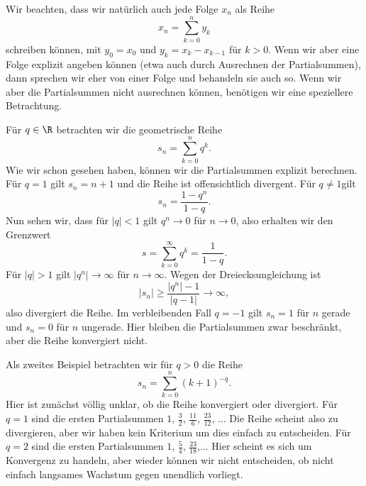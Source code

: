 \documentclass[letterpaper,10pt,english]{jupyterBook}
\begin{document}
Wir beachten, dass wir natürlich auch jede Folge \(x_n\) als Reihe
\begin{equation*}
 x_n =\sum_{k=0}^n y_k
\end{equation*}
schreiben können, mit \(y_0=x_0\) und \(y_k = x_k - x_{k-1}\) für \(k > 0\). Wenn wir aber eine Folge explizit angeben können (etwa auch durch Ausrechnen der Partialsummen), dann sprechen wir eher von einer Folge und behandeln sie auch so. Wenn wir aber die Partialsummen nicht ausrechnen können, benötigen wir eine speziellere Betrachtung.
\label{metrik/reihen:example-1}
\begin{example}{}{}



Für \(q \in \R\) betrachten wir die geometrische Reihe
\begin{equation*}
 s_n = \sum_{k=0}^n q^k.
\end{equation*}
Wie wir schon gesehen haben, können wir die Partialsummen explizit berechnen. Für \(q=1\) gilt \(s_n = n+1\) und die Reihe ist offensichtlich divergent. Für \(q\neq 1 \)gilt
\begin{equation*}
 s_n = \frac{1-q^n}{1-q}.
\end{equation*}
Nun sehen wir, dass für \(|q| <1\) gilt \(q^n \rightarrow 0\) für \(n \rightarrow 0\), also erhalten wir den Grenzwert
\begin{equation*}
 s  = \sum_{k=0}^\infty q^k = \frac{1}{1-q}.
\end{equation*}
Für \(|q|>1\) gilt \(|q^n| \rightarrow \infty\) für \(n \rightarrow \infty\). Wegen der Dreiecksungleichung ist
\begin{equation*}
 |s_n| \geq \frac{|q^n|-1}{|q-1|} \rightarrow \infty,
\end{equation*}
also divergiert die Reihe.
Im verbleibenden Fall \(q=-1\) gilt \(s_n=1\) für \(n\) gerade und \(s_n=0\) für \(n\) ungerade. Hier bleiben die Partialsummen zwar beschränkt, aber die Reihe konvergiert nicht.
\end{example}
\label{metrik/reihen:example-2}
\begin{example}{}{}



Als zweites Beispiel betrachten wir für \(q > 0\) die Reihe
\begin{equation*}
 s_n = \sum_{k=0}^n (k+1)^{-q}.
\end{equation*}
Hier ist zunächst völlig unklar, ob die Reihe konvergiert oder divergiert. Für \(q=1\) sind die ersten Partialsummen \(1\), \(\frac{3}2\), \(\frac{11}6\), \(\frac{23}{12}\), \(\ldots\) Die Reihe scheint also zu divergieren, aber wir haben kein Kriterium um dies einfach zu entscheiden. Für \(q=2\) sind die ersten Partialsummen \(1\), \(\frac{5}4\), \(\frac{23}{18}\),\(\ldots\) Hier scheint es sich um Konvergenz zu handeln, aber wieder können wir nicht entscheiden, ob nicht einfach langsames Wachstum gegen unendlich vorliegt.
\end{example}
\end{document}
